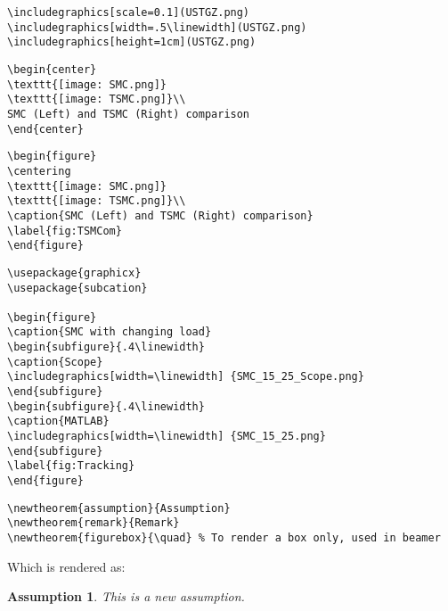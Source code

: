 \documentclass[8pt]{innovativeinnovation-cheatsheet}
\newtheorem{assumption}{Assumption}
\begin{document}
\begin{multicols*}{3}
\begin{lstlisting}
\includegraphics[scale=0.1](USTGZ.png)
\includegraphics[width=.5\linewidth](USTGZ.png)
\includegraphics[height=1cm](USTGZ.png)
\end{lstlisting}

\begin{lstlisting}
\begin{center}
\texttt{[image: SMC.png]}
\texttt{[image: TSMC.png]}\\
SMC (Left) and TSMC (Right) comparison
\end{center}
\end{lstlisting}



\begin{lstlisting}
\begin{figure}
\centering
\texttt{[image: SMC.png]}
\texttt{[image: TSMC.png]}\\
\caption{SMC (Left) and TSMC (Right) comparison}
\label{fig:TSMCom}
\end{figure}
\end{lstlisting}



\begin{lstlisting}
\usepackage{graphicx}
\usepackage{subcation}

\begin{figure}
\caption{SMC with changing load}
\begin{subfigure}{.4\linewidth}
\caption{Scope}
\includegraphics[width=\linewidth] {SMC_15_25_Scope.png}
\end{subfigure}
\begin{subfigure}{.4\linewidth}
\caption{MATLAB}
\includegraphics[width=\linewidth] {SMC_15_25.png}
\end{subfigure}
\label{fig:Tracking}
\end{figure}
\end{lstlisting}



\begin{lstlisting}
\newtheorem{assumption}{Assumption}
\newtheorem{remark}{Remark}
\newtheorem{figurebox}{\quad} % To render a box only, used in beamer
\end{lstlisting}
Which is rendered as:
\begin{assumption}
    This is a new assumption.
\end{assumption}


\end{multicols*}
\end{document}

